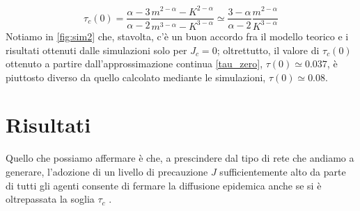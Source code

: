 \begin{equation}
	\tau_c\left(0\right) = \frac{\alpha - 3}{\alpha - 2} \frac{m^{2 - \alpha} - K^{2 - \alpha}}{m^{3 - \alpha} - K^{3 - \alpha}} \simeq \frac{3 - \alpha}{\alpha - 2} \frac{m^{2 - \alpha}}{K^{3 - \alpha}}
	\label{tau_zero}
\end{equation}
Notiamo in \cref{fig:sim2} che, stavolta, c'è un buon accordo fra il modello teorico e i risultati ottenuti dalle simulazioni solo per $ J_c = 0 $; oltrettutto, il valore di $ \tau_c\left(0\right) $ ottenuto a partire dall'approssimazione continua \eqref{tau_zero}, $ \tau\left(0\right) \simeq 0.037 $, è piuttosto diverso da quello calcolato mediante le simulazioni, $ \tau\left(0\right) \simeq 0.08 $. 
\section{Risultati}
Quello che possiamo affermare è che, a prescindere dal tipo di rete che andiamo a generare, l'adozione di un livello di precauzione $ J $ sufficientemente alto da parte di tutti gli agenti consente di fermare la diffusione epidemica anche se si è oltrepassata la soglia $ \tau_c $ \cite{Bagnoli2014}.
